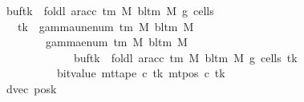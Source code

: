 \begin{isabellebody}
\ \ \ \ \ \ \ \ \ \ \ \ \ \ \ \ {\isacharparenleft}{\kern0pt}buf{\isacharparenleft}{\kern0pt}tk\ {\isacharcolon}{\kern0pt}{\isacharequal}{\kern0pt}\ foldl\ {\isacharparenleft}{\kern0pt}ar{\isacharunderscore}{\kern0pt}acc\ {\isacharparenleft}{\kern0pt}{\isasymGamma}{\isacharunderscore}{\kern0pt}tm\ M{\isacharparenright}{\kern0pt}\ {\isacharparenleft}{\kern0pt}bl{\isacharunderscore}{\kern0pt}tm\ M{\isacharparenright}{\kern0pt}{\isacharparenright}{\kern0pt}\ {\isacharquery}{\kern0pt}g{}\ {\isacharquery}{\kern0pt}cells{}{\isacharparenright}{\kern0pt}{\isacharparenright}{\kern0pt}\isanewline
\ \ \ \ \ \ \ \ \ \ \ \ \ \ \ \ \ \ {\isacharparenleft}{\kern0pt}tk\ {\isacharcolon}{\kern0pt}{\isacharequal}{\kern0pt}\ gamma{\isacharunderscore}{\kern0pt}unenum\ {\isacharparenleft}{\kern0pt}{\isasymGamma}{\isacharunderscore}{\kern0pt}tm\ M{\isacharparenright}{\kern0pt}\ {\isacharparenleft}{\kern0pt}bl{\isacharunderscore}{\kern0pt}tm\ M{\isacharparenright}{\kern0pt}\isanewline
\ \ \ \ \ \ \ \ \ \ \ \ \ \ \ \ \ \ \ \ \ {\isacharparenleft}{\kern0pt}{}\ {\isacharasterisk}{\kern0pt}\ gamma{\isacharunderscore}{\kern0pt}enum\ {\isacharparenleft}{\kern0pt}{\isasymGamma}{\isacharunderscore}{\kern0pt}tm\ M{\isacharparenright}{\kern0pt}\ {\isacharparenleft}{\kern0pt}bl{\isacharunderscore}{\kern0pt}tm\ M{\isacharparenright}{\kern0pt}\isanewline
\ \ \ \ \ \ \ \ \ \ \ \ \ \ \ \ \ \ \ \ \ \ \ \ \ \ \ \ {\isacharparenleft}{\kern0pt}{\isacharparenleft}{\kern0pt}buf{\isacharparenleft}{\kern0pt}tk\ {\isacharcolon}{\kern0pt}{\isacharequal}{\kern0pt}\ foldl\ {\isacharparenleft}{\kern0pt}ar{\isacharunderscore}{\kern0pt}acc\ {\isacharparenleft}{\kern0pt}{\isasymGamma}{\isacharunderscore}{\kern0pt}tm\ M{\isacharparenright}{\kern0pt}\ {\isacharparenleft}{\kern0pt}bl{\isacharunderscore}{\kern0pt}tm\ M{\isacharparenright}{\kern0pt}{\isacharparenright}{\kern0pt}\ {\isacharquery}{\kern0pt}g{}\ {\isacharquery}{\kern0pt}cells{}{\isacharparenright}{\kern0pt}{\isacharparenright}{\kern0pt}\ tk{\isacharparenright}{\kern0pt}\isanewline
\ \ \ \ \ \ \ \ \ \ \ \ \ \ \ \ \ \ \ \ \ \ \ \ {\isacharplus}{\kern0pt}\ bit{\isacharunderscore}{\kern0pt}value\ {\isacharparenleft}{\kern0pt}mt{\isacharunderscore}{\kern0pt}tape\ c{}\ tk\ {\isacharparenleft}{\kern0pt}mt{\isacharunderscore}{\kern0pt}pos\ c{}\ tk{\isacharparenright}{\kern0pt}{\isacharparenright}{\kern0pt}{\isacharparenright}{\kern0pt}{\isacharparenright}{\kern0pt}{\isacharcomma}{\kern0pt}\isanewline
\ \ \ \ \ \ \ \ \ \ \ \ \ \ \ \ dvec{\isacharcomma}{\kern0pt}\ {\isacharquery}{\kern0pt}posk{\isacharprime}{\kern0pt}{\isacharparenright}{\kern0pt}{\isachardoublequoteclose}\isanewline

\end{isabellebody}
